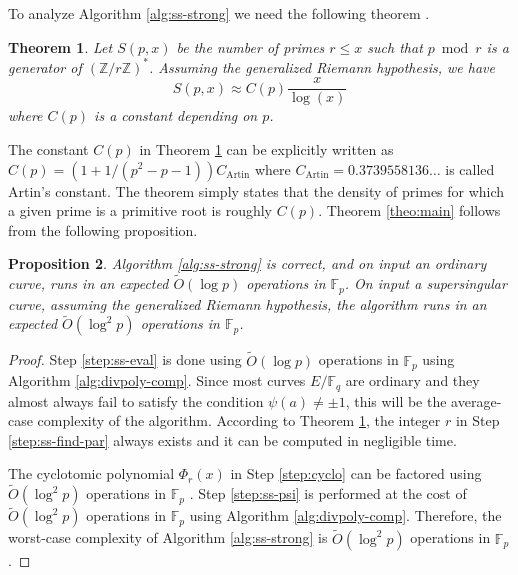 \documentclass[11pt]{article}
\theoremstyle{plain}
\newtheorem{theorem}{Theorem}
\newtheorem{proposition}[theorem]{Proposition}
\theoremstyle{definition}
\newcommand{\tildO}{\tilde{O}}
\def\Z{\ensuremath{\mathbb{Z}}}
\def\F{\ensuremath{\mathbb{F}}}
\begin{document}
To analyze Algorithm \ref{alg:ss-strong} we need the following theorem \cite{hooley1967artin, 
matthews1976generalisation, finch2003mathematical}.
\begin{theorem}
	\label{theo:Artin}
	Let $S(p, x)$ be the number of primes $r \le x$ such that $p \bmod r$ is a generator of 
	$(\Z/r\Z)^*$. Assuming the generalized Riemann hypothesis, we have 
	\[ S(p, x) \approx C(p)\frac{x}{\log(x)}\]
	where $C(p)$ is a constant depending on $p$.
\end{theorem}
The constant $C(p)$ in Theorem \ref{theo:Artin} can be explicitly written as $C(p) = (1 + 1 / (p^2 
- p - 1))C_{\text{Artin}}$ where $C_{\text{Artin}} = 0.3739558136\dots$ is called Artin's 
constant. The theorem simply states that the density of primes for which a given prime is a 
primitive root is roughly $C(p)$. Theorem \ref{theo:main} follows from the following proposition.
\begin{proposition}
	\label{prop:ss-strong}
	Algorithm \ref{alg:ss-strong} is correct, and on input an ordinary curve, runs in an expected 
	$\tildO(\log p)$ operations in $\F_p$. On input a supersingular curve, assuming the generalized 
	Riemann hypothesis, the algorithm runs in an expected $\tildO(\log^2 p)$ operations in $\F_p$.
\end{proposition}
\begin{proof}
	Step \ref{step:ss-eval} is done using $\tildO(\log p)$ operations in $\F_p$ using Algorithm 
	\ref{alg:divpoly-comp}. Since most curves $E/\F_q$ are ordinary and they almost always fail to 
	satisfy the condition $\psi(a) \ne \pm 1$, this will be the average-case complexity of the 
	algorithm. According to Theorem \ref{theo:Artin}, the integer $r$ in Step  
	\ref{step:ss-find-par} always exists and it can be computed in negligible time. 
	
	The cyclotomic polynomial $\Phi_r(x)$ in Step \ref{step:cyclo} can be factored using 
	$\tildO(\log^2p)$ operations in $\F_p$ \cite{shoup1994}. Step \ref{step:ss-psi} is performed at 
	the cost of $\tildO(\log^2p)$ operations in $\F_p$ using Algorithm \ref{alg:divpoly-comp}. 
	Therefore, the worst-case complexity of Algorithm \ref{alg:ss-strong} is $\tildO(\log^2 p)$ 
	operations in $\F_p$.
\end{proof}
\end{document}
